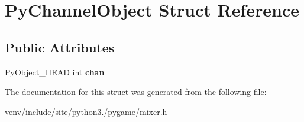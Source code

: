 \hypertarget{struct_py_channel_object}{}\section{Py\+Channel\+Object Struct Reference}
\label{struct_py_channel_object}
\subsection*{Public Attributes}
\begin{DoxyCompactItemize}
\item 
\mbox{\label{struct_py_channel_object_addb0e28e33e6eba39cdadbdebd94a168}} 
Py\+Object\+\_\+\+H\+E\+AD int {\bfseries chan}
\end{DoxyCompactItemize}


The documentation for this struct was generated from the following file\+:\begin{DoxyCompactItemize}
\item 
venv/include/site/python3./pygame/mixer.\+h\end{DoxyCompactItemize}
